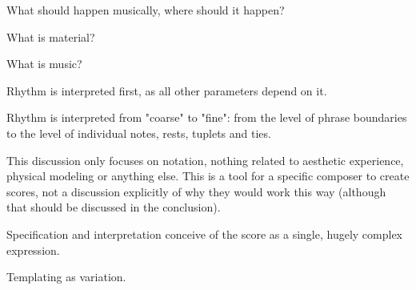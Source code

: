 What should happen musically, where should it happen?

What is material?

What is music?

Rhythm is interpreted first, as all other parameters depend on it.

Rhythm is interpreted from "coarse" to "fine": from the level of phrase
boundaries to the level of individual notes, rests, tuplets and ties.

This discussion only focuses on notation, nothing related to aesthetic
experience, physical modeling or anything else. This is a tool for a specific
composer to create scores, not a discussion explicitly of why they would work
this way (although that should be discussed in the conclusion).

Specification and interpretation conceive of the score as a single, hugely
complex expression.

Templating as variation.